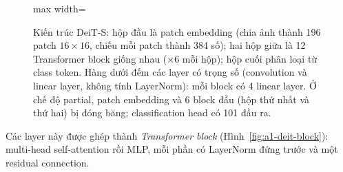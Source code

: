 \documentclass[11pt,a4paper]{article}
\begin{document}
\begin{figure}[!htb]
\begin{adjustbox}{max width=\linewidth}
\end{adjustbox}
\caption{Kiến trúc DeiT-S: hộp đầu là patch embedding (chia ảnh thành 196 patch \(16{\times}16\), chiếu mỗi patch thành 384 số); hai hộp giữa là 12 Transformer block giống nhau (\(\times 6\) mỗi hộp); hộp cuối phân loại từ class token. Hàng dưới đếm các layer có trọng số (convolution và linear layer, không tính LayerNorm): mỗi block có 4 linear layer. Ở chế độ partial, patch embedding và 6 block đầu (hộp thứ nhất và thứ hai) bị đóng băng; classification head có 101 đầu ra.}
\label{fig:a1-deit}
\end{figure}

Các layer này được ghép thành \emph{Transformer block} (Hình~\ref{fig:a1-deit-block}): multi-head self-attention rồi MLP, mỗi phần có LayerNorm đứng trước và một residual connection.
\end{document}
